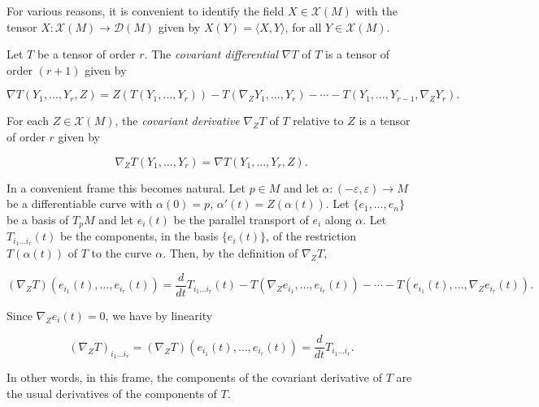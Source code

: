 \begin{remark}[Remark 5.6]
  \label{rem:dc-ch4-5-6}
  For various reasons, it is convenient to identify the field $X\in\mathcal{X}(M)$
  with the tensor $X:\mathcal{X}(M)\to\mathcal{D}(M)$ given by $X(Y)=\langle X,Y\rangle$,
  for all $Y\in\mathcal{X}(M)$.
\end{remark}

\begin{definition}
  \label{def:dc-ch4-5-7}
  \leanok
  Let $T$ be a tensor of order $r$. The \emph{covariant differential} $\nabla T$ of $T$
  is a tensor of order $(r+1)$ given by
  
  $$
  \nabla T(Y_1,\dots,Y_r,Z)=Z(T(Y_1,\dots,Y_r))-T(\nabla_Z Y_1,\dots,Y_r)-\cdots-T(Y_1,\dots,Y_{r-1},\nabla_Z Y_r).
  $$
  
  For each $Z\in\mathcal{X}(M)$, the \emph{covariant derivative} $\nabla_Z T$ of $T$
  relative to $Z$ is a tensor of order $r$ given by
  
  $$
  \nabla_Z T(Y_1,\dots,Y_r)=\nabla T(Y_1,\dots,Y_r,Z).
  $$
  
  In a convenient frame this becomes natural. Let $p\in M$ and let
  $\alpha:(-\varepsilon,\varepsilon)\to M$ be a differentiable curve with $\alpha(0)=p$,
  $\alpha'(t)=Z(\alpha(t))$. Let $\{e_1,\dots,e_n\}$ be a basis of $T_pM$ and let
  $e_i(t)$ be the parallel transport of $e_i$ along $\alpha$. Let $T_{i_1\dots i_r}(t)$
  be the components, in the basis $\{e_i(t)\}$, of the restriction $T(\alpha(t))$ of
  $T$ to the curve $\alpha$. Then, by the definition of $\nabla_Z T$,
  
  $$
  (\nabla_Z T)(e_{i_1}(t),\dots,e_{i_r}(t))=\frac{d}{dt}T_{i_1\dots i_r}(t)-T(\nabla_Z e_{i_1},\dots,e_{i_r}(t))-\cdots-T(e_{i_1}(t),\dots,\nabla_Z e_{i_r}(t)).
  $$
  
  Since $\nabla_Z e_i(t)=0$, we have by linearity
  
  $$
  (\nabla_Z T)_{i_1\dots i_r}=(\nabla_Z T)(e_{i_1}(t),\dots,e_{i_r}(t))=\frac{d}{dt}T_{i_1\dots i_r}.
  $$
  
  In other words, in this frame, the components of the covariant derivative of $T$
  are the usual derivatives of the components of $T$.
\end{definition}

